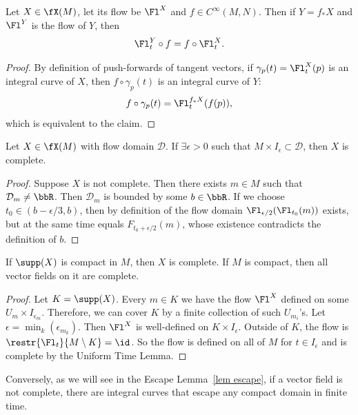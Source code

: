 \begin{cor}\label{cor naturality of flows}
    Let $X\in\fX(M)$, let its flow be $\Fl^X$ and $f\in C^\infty(M,N)$. Then if $Y=f_\ast X$ and $\Fl^Y$ is the flow of $Y$, then 
    \[\Fl^Y_t\circ f=f\circ \Fl^X_t.\]
\end{cor}
\begin{proof}
    By definition of push-forwards of tangent vectors, if $\gamma_p(t)=\Fl_t^X(p)$ is an integral curve of $X$, then $f\circ \gamma_p(t)$ is an integral curve of $Y$:
    \[f\circ \gamma_p(t)=\Fl^{f_\ast X}_t(f(p)),\]
    which is equivalent to the claim.
\end{proof}

\begin{thm}\label{lem uniform time}
    Let $X\in\fX(M)$ with flow domain $\mathcal{D}$. If $\exists\epsilon>0$ such that $M\times I_\epsilon\subset\mathcal{D}$, then $X$ is complete.
\end{thm}
\begin{proof}
    Suppose $X$ is not complete. Then there exists $m\in M$ such that $\mathcal{D}_m\neq \bbR $. Then $\mathcal{D}_m$ is bounded by some $b\in\bbR $. If we choose $t_0\in(b-\epsilon/3,b)$, then by definition of the flow domain $\Fl_{\epsilon/2}(\Fl_{t_0}(m))$ exists, but at the same time equals $F_{t_0+\epsilon/2}(m)$, whose existence contradicts the definition of $b$.
\end{proof}
\begin{cor}
    If $\supp (X)$ is compact in $M$, then $X$ is complete. If $M$ is compact, then all vector fields on it are complete.
\end{cor}
\begin{proof}
    Let $K=\supp(X)$. Every $m\in K$ we have the flow $\Fl^X$ defined on some $U_m\times I_{\epsilon_m}$. Therefore, we can cover $K$ by a finite collection of such $U_{m_i}$'s. Let $\epsilon=\min_k(\epsilon_{m_k})$. Then $\Fl^X$ is well-defined on $K\times I_\epsilon$. Outside of $K$, the flow is $\restr{\Fl_t}{M\setminus K}=\id$. So the flow is defined on all of $M$ for $t\in I_\epsilon$ and is complete by the Uniform Time Lemma.
\end{proof}

Conversely, as we will see in the Escape Lemma~\ref{lem escape}, if a vector field is not complete, there are integral curves that escape any compact domain in finite time.


